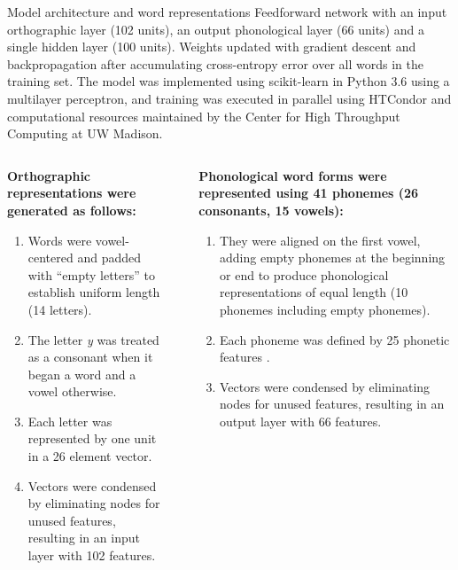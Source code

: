 \documentclass[final]{beamer}
\newlength{\onecolwid}
\begin{document}
\begin{frame}[t]
\begin{columns}[t]
\begin{column}{\onecolwid}
\begin{block}{Model architecture and word representations}
Feedforward network with an input orthographic layer (102 units), an output phonological layer (66 units) and a single hidden layer (100 units).
Weights updated with gradient descent and backpropagation after accumulating cross-entropy error over all words in the training set.
The model was implemented using scikit-learn in Python 3.6 using a multilayer perceptron, and training was executed in parallel using HTCondor \cite{Thain2005} and computational resources maintained by the Center for High Throughput Computing at UW Madison.

\vspace{1em}

\begin{columns}[t]
  \small
  \begin{column}{0.48\linewidth}
  \textbf{Orthographic representations were generated as follows:}
  \begin{enumerate}
    \item Words were vowel-centered and padded with ``empty letters'' to establish uniform length (14 letters).
    \item The letter \textit{y} was treated as a consonant when it began a word and a vowel otherwise.
    \item Each letter was represented by one unit in a 26 element vector.
    \item Vectors were condensed by eliminating nodes for unused features, resulting in an input layer with 102 features.
  \end{enumerate}
  \end{column}
  \begin{column}{0.04\linewidth}
  \end{column}
  \begin{column}{0.48\linewidth}
    \textbf{Phonological word forms were represented using 41 phonemes (26 consonants, 15 vowels):}
  \begin{enumerate}
    \item They were aligned on the first vowel, adding empty phonemes at the beginning or end to produce phonological representations of equal length (10 phonemes including empty phonemes).
    \item Each phoneme was defined by 25 phonetic features \cite{Harm1999}.
    \item Vectors were condensed by eliminating nodes for unused features, resulting in an output layer with 66 features.
  \end{enumerate}
  \end{column}
\end{columns}


\end{block}
\end{column}
\end{columns}
\end{frame}
\end{document}
